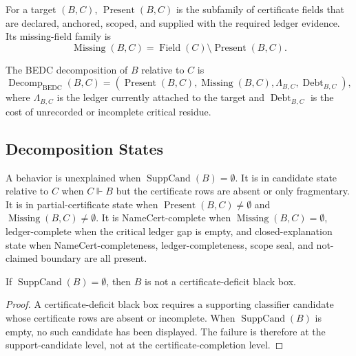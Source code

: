 \begin{definition}
\label{def:philosophy-present-missing-fields}
For a target $(B,C)$, $\operatorname{Present}(B,C)$ is the subfamily of
certificate fields that are declared, anchored, scoped, and supplied with
the required ledger evidence. Its missing-field family is
$$
\operatorname{Missing}(B,C)
=
\operatorname{Field}(C)\setminus\operatorname{Present}(B,C).
$$
\end{definition}

\begin{definition}
\label{def:philosophy-bedc-black-box-decomposition}
The BEDC decomposition of $B$ relative to $C$ is
$$
\operatorname{Decomp}_{\mathrm{BEDC}}(B,C)
=
(\operatorname{Present}(B,C),
\operatorname{Missing}(B,C),
\Lambda_{B,C},
\operatorname{Debt}_{B,C}),
$$
where $\Lambda_{B,C}$ is the ledger currently attached to the target and
$\operatorname{Debt}_{B,C}$ is the cost of unrecorded or incomplete
critical residue.
\end{definition}

\subsection{Decomposition States}
\label{subsec:philosophy-black-box-decomposition-states}

\begin{definition}
\label{def:philosophy-decomposition-states}
A behavior is unexplained when
$\operatorname{SuppCand}(B)=\emptyset$. It is in candidate state
relative to $C$ when $C\Vdash B$ but the certificate rows are absent or
only fragmentary. It is in partial-certificate state when
$\operatorname{Present}(B,C)\neq\emptyset$ and
$\operatorname{Missing}(B,C)\neq\emptyset$. It is NameCert-complete when
$\operatorname{Missing}(B,C)=\emptyset$, ledger-complete when the
critical ledger gap is empty, and closed-explanation state when
NameCert-completeness, ledger-completeness, scope seal, and not-claimed
boundary are all present.
\end{definition}

\begin{theorem}
\label{thm:philosophy-unexplained-black-box-states-distinct}
If $\operatorname{SuppCand}(B)=\emptyset$, then $B$ is not a
certificate-deficit black box.
\end{theorem}
\begin{proof}
A certificate-deficit black box requires a supporting classifier
candidate whose certificate rows are absent or incomplete. When
$\operatorname{SuppCand}(B)$ is empty, no such candidate has been
displayed. The failure is therefore at the support-candidate level, not
at the certificate-completion level.
\end{proof}

